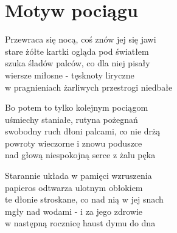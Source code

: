 \section{Motyw pociągu}
\begin{text}
Przewraca się nocą, coś znów jej się jawi\\
stare żółte kartki ogląda pod światłem\\
szuka śladów palców, co dla niej pisały\\
wiersze miłosne - tęsknoty liryczne\\
w pragnieniach żarliwych przestrogi niedbałe

\vin Bo potem to tylko kolejnym pociągom\\
\vin uśmiechy staniałe, rutyna pożegnań\\
\vin swobodny ruch dłoni palcami, co nie drżą\\
\vin powroty wieczorne i znowu poduszce\\
\vin nad głową niespokojną serce z żalu pęka

Starannie układa w pamięci wzruszenia\\
papieros odtwarza ulotnym obłokiem\\
te dłonie stroskane, co nad nią w jej snach\\
mgły nad wodami - i za jego zdrowie\\
w następną rocznicę haust dymu do dna
\end{text}